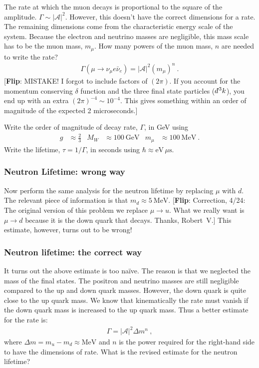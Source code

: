 \documentclass[12pt]{article}
\newcommand{\dbar}{d\mkern-6mu\mathchar'26\hspace{-.1em}}    %
\newcommand{\flip}[1]{{\color{red} [\textbf{Flip}: {#1}]}}
\begin{document}
The rate at which the muon decays is proportional to the square of the amplitude. $\Gamma \sim |\mathcal A|^2$. However, this doesn't have the correct dimensions for a rate. The remaining dimensions come from the characteristic energy scale of the system. Because the electron and neutrino masses are negligible, this mass scale has to be the muon mass, $m_\mu$. How many powers of the muon mass, $n$ are needed to write the rate?
\begin{align}
	\Gamma(\mu\to \nu_\mu e\bar\nu_e) = |\mathcal A|^2 (m_\mu)^n \ .
\end{align}
\flip{MISTAKE! I forgot to include factors of $(2\pi)$. If you account for the momentum conserving $\delta$ function and the three final state particles ($\dbar^3 k$), you end up with an extra $(2\pi)^{-4}\sim 10^{-4}$. This gives something within an order of magnitude of the expected 2 microseconds.}

Write the order of magnitude of decay rate, $\Gamma$, in GeV using
\begin{align}
	g&\approx \frac{2}{3}
	&
	M_W &\approx 100~\text{GeV}
	&
	m_\mu &\approx 100~\text{MeV} \ .
\end{align}
Write the lifetime, $\tau = 1/\Gamma$, in seconds using $\hbar \approx \text{eV} \, \mu\text{s}$.




\subsubsection{Neutron Lifetime: wrong way}


Now perform the same analysis for the neutron lifetime by replacing $\mu$ with $d$. The relevant piece of information is that $m_d \approx 5~\text{MeV}$. \flip{Correction, 4/24: The original version of this problem we replace $\mu\to u$. What we really want is $\mu\to d$ because it is the down quark that decays. Thanks, Robert~V.} This estimate, however, turns out to be wrong!

\subsubsection{Neutron lifetime: the correct way}

It turns out the above estimate is too na\"ive. The reason is that we neglected the mass of the final states. The positron and neutrino masses are still negligible compared to the up and down quark masses. However, the down quark is quite close to the up quark mass. We know that kinematically the rate must vanish if the down quark mass is increased to the up quark mass. Thus a better estimate for the rate is:
\begin{align}
	\Gamma = |\mathcal A|^2 \Delta m^n \ ,
\end{align}
where $\Delta m = m_u - m_d \approx \text{MeV}$ and $n$ is the power required for the right-hand side to have the dimensions of rate. What is the revised estimate for the neutron lifetime? 
\end{document}
